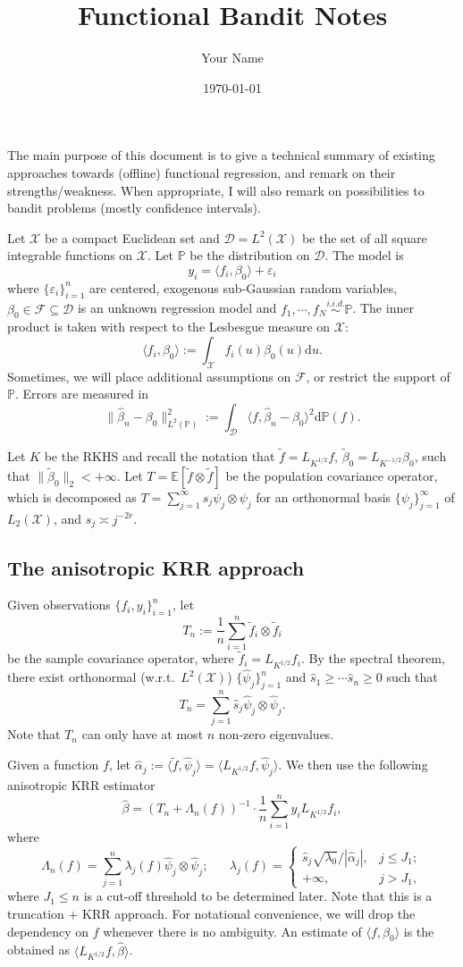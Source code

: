 \documentclass[11pt,a4paper]{article}
\title{Functional Bandit Notes}
\author{Your Name}
\date{\today}
\renewcommand{\hat}{\widehat}
\renewcommand{\tilde}{\widetilde}
\theoremstyle{definition}
\theoremstyle{plain}
\theoremstyle{remark}
\newcommand{\mX}{\mathcal X}
\newcommand{\mD}{\mathcal D}
\newcommand{\bP}{\mathbb P}
\newcommand{\lp}{L^2(\bP)}
\newcommand{\ud}{\mathrm d}
\begin{document}
The main purpose of this document is to give a technical summary of existing approaches towards (offline) functional regression,
and remark on their strengths/weakness. When appropriate, I will also remark on possibilities to bandit problems (mostly confidence intervals).

Let $\mX$ be a compact Euclidean set and $\mD=L^2(\mX)$ be the set of all square integrable functions on $\mX$.
Let $\mathbb P$ be the distribution on $\mD$. The model is 
$$
y_i = \langle f_i, \beta_0\rangle + \varepsilon_i
$$
where $\{\varepsilon_i\}_{i=1}^n$ are centered, exogenous sub-Gaussian random variables, $\beta_0\in\mathcal F\subseteq \mD$ is an unknown regression model and $f_1,\cdots,f_N\overset{i.i.d.}{\sim}\mathbb P$.
The inner product is taken with respect to the Lesbesgue measure on $\mX$:
$$
\langle f_i, \beta_0\rangle := \int_{\mX} f_i(u)\beta_0(u)\ud u.
$$
Sometimes, we will place additional assumptions on $\mathcal F$, or restrict the support of $\bP$.
Errors are measured in 
$$
\|\hat \beta_n-\beta_0\|_{\lp}^2 := \int_{\mD} \langle f, \hat \beta_n-\beta_0\rangle^2\ud\bP(f).
$$

Let $K$ be the RKHS and recall the notation that $\tilde f = L_{K^{1/2}}f$, $\tilde\beta_0=L_{K^{-1/2}}\beta_0$, such that $\|\tilde\beta_0\|_2 < +\infty$.
Let $T=\mathbb E[\tilde f\otimes \tilde f]$ be the population covariance operator, which is decomposed as $T=\sum_{j=1}^{\infty}s_j\psi_j\otimes\psi_j$ for an orthonormal basis $\{\psi_j\}_{j=1}^{\infty}$ of $L_2(\mX)$,
and $s_j\asymp j^{-2r}$.

\subsection{The anisotropic KRR approach}

Given observations $\{f_i,y_i\}_{i=1}^n$, let 
$$
T_n := \frac{1}{n}\sum_{i=1}^n \tilde f_i\otimes\tilde f_i
$$
be the sample covariance operator, where $\tilde f_i = L_{K^{1/2}}f_i$. By the spectral theorem, there exist orthonormal (w.r.t.~$L^2(\mX)$) $\{\hat\psi_j\}_{j=1}^n$ and $\hat s_1\geq\cdots\hat s_n\geq 0$ such that
$$
T_n = \sum_{j=1}^n \hat s_j\hat\psi_j\otimes\hat\psi_j.
$$
Note that $T_n$ can only have at most $n$ non-zero eigenvalues.

Given a function $f$, let $\hat\alpha_j := \langle \tilde f, \hat\psi_j\rangle=\langle L_{K^{1/2}}f,\hat\psi_j\rangle$. We then use the following anisotropic KRR estimator
$$
\hat\beta = \left(T_n + \Lambda_n(f)\right)^{-1}\cdot \frac{1}{n}\sum_{i=1}^n y_i L_{K^{1/2}}f_i,
$$
where
$$
\Lambda_n(f) = \sum_{j=1}^n\lambda_j(f)\hat\psi_j\otimes\hat\psi_j;\;\;\;\;\;\;\lambda_j(f) = \left\{\begin{array}{ll} \hat s_j\sqrt{\lambda_0}/|\hat\alpha_j|,& j\leq J_1;\\ +\infty,& j>J_1,\end{array}\right.
$$
where $J_1\leq n$ is a cut-off threshold to be determined later.
{\color{red}Note that this is a truncation + KRR approach.}
For notational convenience, we will drop the dependency on $f$ whenever there is no ambiguity. An estimate of $\langle f,\beta_0\rangle$ is the obtained as $\langle L_{K^{1/2}} f, \hat\beta\rangle$.
\end{document}
